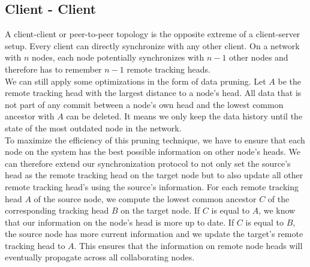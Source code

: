 \subsection{Client - Client}
\label{sec:histo.topologies.p2p}
A client-client or peer-to-peer topology is the opposite extreme of a client-server setup.
Every client can directly synchronize with any other client.
On a network with $ n $ nodes, each node potentially synchronizes with $ n - 1 $ other nodes and therefore has to remember $ n - 1 $ remote tracking heads.\\
We can still apply some optimizations in the form of data pruning.
Let $ A $ be the remote tracking head with the largest distance to a node's head.
All data that is not part of any commit between a node's own head and the lowest common ancestor with $ A $ can be deleted.
It means we only keep the data history until the state of the most outdated node in the network.\\
To maximize the efficiency of this pruning technique, we have to ensure that each node on the system has the best possible information on other node's heads.
We can therefore extend our synchronization protocol to not only set the source's head as the remote tracking head on the target node but to also update all other remote tracking head's using the source's information.
For each remote tracking head $ A $ of the source node, we compute the lowest common ancestor $ C $ of the corresponding tracking head $ B $ on the target node.
If $ C $ is equal to $ A $, we know that our information on the node's head is more up to date.
If $ C $ is equal to $ B $, the source node has more current information and we update the target's remote tracking head to $ A $.
This ensures that the information on remote node heads will eventually propagate across all collaborating nodes.


